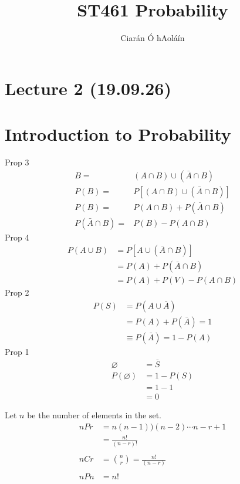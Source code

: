 \documentclass{article}
\title{ST461 Probability}
\author{Ciarán Ó hAoláín}
\let\nset\varnothing
\let\ddd\cdots
\theoremstyle{definition}
\theoremstyle{remark}
\theoremstyle{example}
\begin{document}
	\maketitle
	
	\section*{Lecture 2 (19.09.26)}
	\section{Introduction to Probability}
	Prop 3
	\begin{align*}
		B = & (A \cap B) \cup (\bar{A} \cap B) \\
		P(B) = &  P \left[ (A \cap B) \cup (\bar{A} \cap B) \right]\\
		P(B) = & P(A \cap B) + P(\bar{A} \cap B)\\
		P(\bar{A} \cap B) = & P(B) - P(A \cap B)
	\end{align*}
	Prop 4
	\begin{align*}
		P(A \cup B) & = P \left[ A \cup (\bar{A} \cap B) \right]\\
		& = P(A) + P(\bar{A} \cap B)\\
		& = P(A) + P(V) - P(A \cap B)
	\end{align*}
	Prop 2
	\begin{align*}
		P(S) & = P(A \cup \bar{A})\\
		& = P(A) + P(\bar{A}) = 1\\
		& \equiv P(\bar{A}) = 1-P(A)
	\end{align*}
	Prop 1
	\begin{align*}
		\nset & = \bar{S}\\
		P(\nset) & = 1 - P(S)\\
		& = 1-1\\
		& = 0
	\end{align*}
	
	Let $n$ be the number of elements in the set.
	\begin{align*}
		nPr & = n(n-1))(n-2) \ddd n-r+1\\
		& = \frac{n!}{(n-r)!}\\\\
		nCr & = {n \choose r} = \frac{n!}{(n-r)}\\\\
		nPn & = n!
	\end{align*}
	
\end{document}
